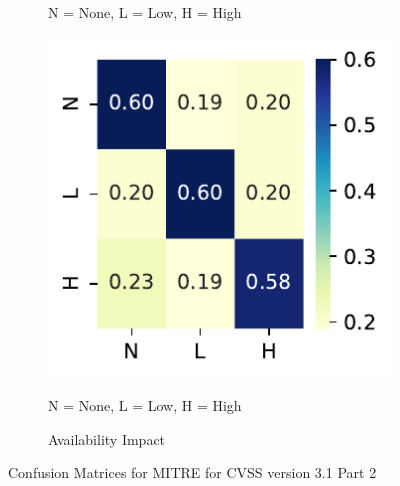 \documentclass[12pt]{article}
\begin{document}
\begin{figure}
\begin{subfigure}[b]{0.45\textwidth}
		\begin{tablenotes}
			\footnotesize
			\item \quad N = None, L = Low, H = High
		\end{tablenotes}
	\end{subfigure}
	\hfill
	\begin{subfigure}[b]{0.45\textwidth}
		\includegraphics[width=\textwidth]{./figures/confusion_matrices/availability_impact_mitre.pdf}
		\caption{Availability Impact}

		\begin{tablenotes}
			\footnotesize
			\item \quad N = None, L = Low, H = High
		\end{tablenotes}
	\end{subfigure}

	\caption{\label{fig:mitre_31_confusion_matrices_2}Confusion Matrices for MITRE for CVSS version 3.1 Part 2}
\end{figure}
\end{document}
